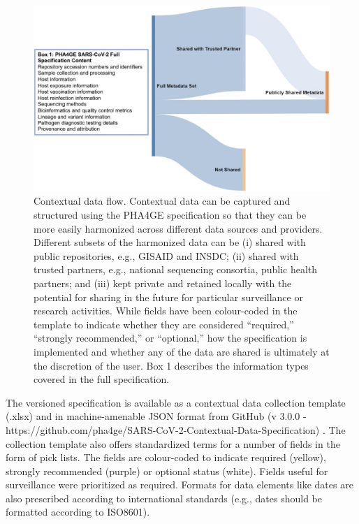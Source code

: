 \begin{figure}[h!]
\centering
\includegraphics[width=\textwidth]{figures/chapter 7/giac003fig1.jpeg}
\caption{Contextual data flow. Contextual data can be captured and structured using the PHA4GE specification so that they can be more easily harmonized across different data sources and providers. Different subsets of the harmonized data can be (i) shared with public repositories, e.g., GISAID and INSDC; (ii) shared with trusted partners, e.g., national sequencing consortia, public health partners; and (iii) kept private and retained locally with the potential for sharing in the future for particular surveillance or research activities. While fields have been colour-coded in the template to indicate whether they are considered “required,” “strongly recommended,” or “optional,” how the specification is implemented and whether any of the data are shared is ultimately at the discretion of the user. Box 1 describes the information types covered in the full specification.}
\label{fig:chap7_figure_1}
\end{figure}

The versioned specification is available as a contextual data collection template (.xlsx) and in machine-amenable JSON format from GitHub (v 3.0.0 - https://github.com/pha4ge/SARS-CoV-2-Contextual-Data-Specification) \cite{public_health_alliance_for_genomic_epidemiology_sars-cov-2-contextual-data-specification_nodate}. The collection template also offers standardized terms for a number of fields in the form of pick lists. The fields are colour-coded to indicate required (yellow), strongly recommended (purple) or optional status (white). Fields useful for surveillance were prioritized as required. Formats for data elements like dates are also prescribed according to international standards (e.g., dates should be formatted according to ISO8601).

